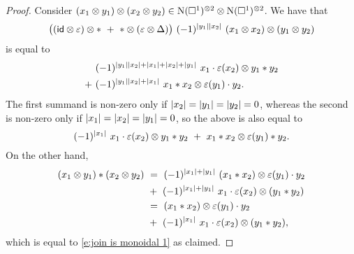 \begin{proof}
	Consider $(x_1 \otimes y_1) \otimes (x_2 \otimes y_2) \in \operatorname{N}(\square^1)^{\otimes 2} \otimes \operatorname{N}(\square^1)^{\otimes 2}$.
	We have that
	\[
	\big((\id \otimes \varepsilon) \otimes \ast \ + \ \ast \otimes (\varepsilon \otimes \Delta)\big) \ (-1)^{\bars{y_1} \bars{x_2}} \ (x_1 \otimes x_2) \otimes (y_1 \otimes y_2)
	\]
	is equal to
	\begin{align*}
		& (-1)^{\lvert y_1\rvert \lvert x_2\rvert + \lvert x_1\rvert + \lvert x_2\rvert + \lvert y_1\rvert} \ x_1 \cdot \varepsilon(x_2) \otimes y_1 \ast y_2 \\ + \
		& (-1)^{\lvert y_1\rvert \lvert x_2\rvert + \lvert x_1\rvert} \ x_1 \ast x_2 \otimes \varepsilon(y_1) \cdot y_2.
	\end{align*}
	The first summand is non-zero only if $\lvert x_2\rvert = \lvert y_1\rvert = \lvert y_2\rvert = 0$, whereas the second is non-zero only if $\lvert x_1\rvert = \lvert x_2\rvert = \lvert y_1\rvert = 0$, so the above is also equal to
	\begin{equation} \label{e:join is monoidal 1}
		(-1)^{\lvert x_1\rvert} \ x_1 \cdot \varepsilon(x_2) \otimes y_1 \ast y_2 \ + \
		x_1 \ast x_2 \otimes \varepsilon(y_1) \ast y_2.
	\end{equation}
	On the other hand,
	\begin{align*}
		(x_1 \otimes y_1) \ast (x_2 \otimes y_2) \ & =\
		(-1)^{\lvert x_1\rvert + \lvert y_1\rvert} \ (x_1 \ast x_2) \otimes \varepsilon(y_1) \cdot y_2 \\ & +\
		(-1)^{\lvert x_1\rvert + \lvert y_1\rvert} \ x_1 \cdot \varepsilon(x_2) \otimes (y_1 \ast y_2) \\ \ & =\
		(x_1 \ast x_2) \otimes \varepsilon(y_1) \cdot y_2 \\ & +\
		(-1)^{\lvert x_1\rvert} \ x_1 \cdot \varepsilon(x_2) \otimes (y_1 \ast y_2),
	\end{align*}
	which is equal to \eqref{e:join is monoidal 1} as claimed.
\end{proof}

